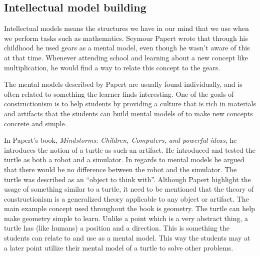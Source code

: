 
\subsection{Intellectual model building}
Intellectual models means the structures we have in our mind that we use when we perform tasks such as mathematics. Seymour Papert wrote that through his childhood he used gears as a mental model, even though he wasn't aware of this at that time. Whenever attending school and learning about a new concept like multiplication, he would find a way to relate this concept to the gears. 

\bigskip\noindent
The mental models described by Papert are usually found individually, and is often related to something the learner finds interesting. 
One of the goals of constructionism is to help students by providing a culture that is rich in materials and artifacts that the students can build mental models of to make new concepts concrete and simple. 

\bigskip\noindent
In Papert's book, \textit{Mindstorms: Children, Computers, and powerful ideas}\cite{papert1980mindstorms}, he introduces the notion of a turtle as such an artifact. 
He introduced and tested the turtle as both a robot and a simulator. In regards to mental models he argued that there would be no difference between the robot and the simulator. The turtle was described as an ``object to think with''. Although Papert highlight the usage of something similar to a turtle, it need to be mentioned that the theory of constructionism is a generalized theory applicable to any object or artifact. 
The main example concept used throughout the book is geometry. The turtle can help make geometry simple to learn. Unlike a point which is a very abstract thing, a turtle has (like humans) a position and a direction. 
This is something the students can relate to and use as a mental model. 
This way the students may at a later point utilize their mental model of a turtle to solve other problems. 

